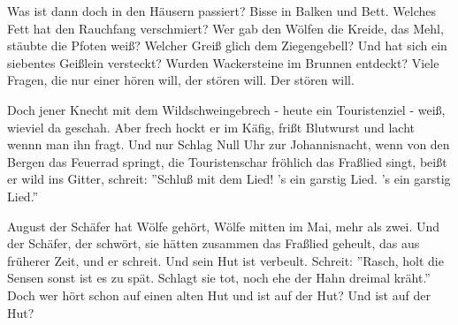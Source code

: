 \begin{guitar}
\begin{multicols}{2}
Was ist dann doch in den Häusern passiert?
Bisse in Balken und Bett. Welches Fett
hat den Rauchfang verschmiert?
Wer gab den Wölfen die Kreide, das Mehl,
stäubte die Pfoten weiß? Welcher Greiß
glich dem Ziegengebell?
Und hat sich ein siebentes Geißlein versteckt?
Wurden Wackersteine im Brunnen entdeckt?
Viele Fragen, die nur einer hören will,
der stören will. Der stören will.

Doch jener Knecht mit dem Wildschweingebrech
- heute ein Touristenziel - weiß, wieviel
da geschah. Aber frech
hockt er im Käfig, frißt Blutwurst und lacht
wennn man ihn fragt. Und nur Schlag Null Uhr
zur Johannisnacht,
wenn von den Bergen das Feuerrad springt,
die Touristenschar fröhlich das Fraßlied singt,
beißt er wild ins Gitter, schreit: ''Schluß mit dem Lied!
's ein garstig Lied. 's ein garstig Lied.''

August der Schäfer hat Wölfe gehört,
Wölfe mitten im Mai, mehr als zwei.
Und der Schäfer, der schwört,
sie hätten zusammen das Fraßlied geheult,
das aus früherer Zeit, und er schreit.
Und sein Hut ist verbeult.
Schreit: ''Rasch, holt die Sensen sonst ist es zu spät.
Schlagt sie tot, noch ehe der Hahn dreimal kräht.''
Doch wer hört schon auf einen alten Hut
und ist auf der Hut? Und ist auf der Hut? 
\end{multicols}
\end{guitar}
